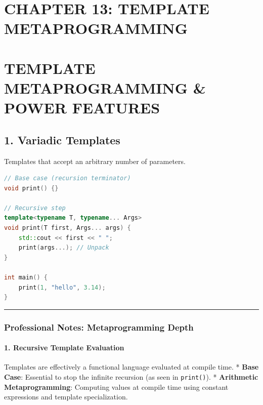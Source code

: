 \hypertarget{chapter-13-template-metaprogramming}{%
\section{CHAPTER 13: TEMPLATE
METAPROGRAMMING}\label{chapter-13-template-metaprogramming}}

\hypertarget{template-metaprogramming-power-features}{%
\section{TEMPLATE METAPROGRAMMING \& POWER
FEATURES}\label{template-metaprogramming-power-features}}

\hypertarget{variadic-templates}{%
\subsection{1. Variadic Templates}\label{variadic-templates}}

Templates that accept an arbitrary number of parameters.

\begin{lstlisting}[language={C++}]
// Base case (recursion terminator)
void print() {}

// Recursive step
template<typename T, typename... Args>
void print(T first, Args... args) {
    std::cout << first << " ";
    print(args...); // Unpack
}

int main() {
    print(1, "hello", 3.14);
}
\end{lstlisting}

\begin{center}\rule{0.5\linewidth}{0.5pt}\end{center}

\hypertarget{professional-notes-metaprogramming-depth}{%
\subsubsection{Professional Notes: Metaprogramming
Depth}\label{professional-notes-metaprogramming-depth}}

\hypertarget{recursive-template-evaluation}{%
\paragraph{1. Recursive Template
Evaluation}\label{recursive-template-evaluation}}

Templates are effectively a functional language evaluated at compile
time. * \textbf{Base Case}: Essential to stop the infinite recursion (as
seen in \passthrough{\lstinline!print()!}). * \textbf{Arithmetic
Metaprogramming}: Computing values at compile time using constant
expressions and template specialization.

